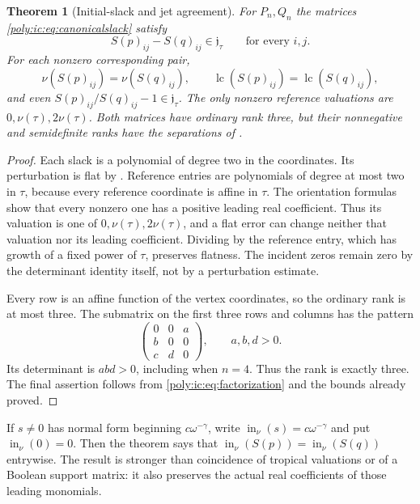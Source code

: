 \documentclass[11pt,a4paper]{article}
\numberwithin{equation}{section}
\newtheorem{theorem}{Theorem}[section]
\theoremstyle{plain}
\newcommand{\JJ}{\mathfrak j}
\newcommand{\lc}{\operatorname{lc}}
\newcommand{\ini}{\operatorname{in}_{\nu}}
\begin{document}
\begin{theorem}[Initial-slack and jet agreement]\label{poly:ic:thm:slack}
For $P_n,Q_n$ the matrices \eqref{poly:ic:eq:canonicalslack} satisfy
\[
 S(p)_{ij}-S(q)_{ij}\in\JJ_\tau\qquad\text{for every }i,j.
\]
For each nonzero corresponding pair,
\begin{equation}\label{poly:ic:eq:initialslack}
 \nu(S(p)_{ij})=\nu(S(q)_{ij}),\qquad
 \lc(S(p)_{ij})=\lc(S(q)_{ij}),
\end{equation}
and even $S(p)_{ij}/S(q)_{ij}-1\in\JJ_\tau$.
The only nonzero reference valuations are $0,\nu(\tau),2\nu(\tau)$.
Both matrices have ordinary rank three, but their nonnegative and
semidefinite ranks have the separations of .
\end{theorem}
\begin{proof}
Each slack is a polynomial of degree two in the coordinates. Its
perturbation is flat by . Reference entries are
polynomials of degree at most two in $\tau$, because every reference
coordinate is affine in $\tau$. The orientation formulas show that
every nonzero one has a positive leading real coefficient. Thus its
valuation is one of $0,\nu(\tau),2\nu(\tau)$, and a flat error can change
neither that valuation nor its leading coefficient. Dividing by the
reference entry, which has growth of a fixed power of $\tau$, preserves
flatness. The incident zeros remain zero by the determinant identity
itself, not by a perturbation estimate.

Every row is an affine function of the vertex coordinates, so the
ordinary rank is at most three. The submatrix on the first three rows
and columns has the pattern
\[
 \begin{pmatrix}0&0&a\\b&0&0\\c&d&0\end{pmatrix},
 \qquad a,b,d>0.
\]
Its determinant is $abd>0$, including when $n=4$. Thus the rank is exactly
three. The final assertion follows from \eqref{poly:ic:eq:factorization} and the
bounds already proved.
\end{proof}

If $s\ne0$ has normal form beginning $c\omega^{-\gamma}$, write
$\ini(s)=c\omega^{-\gamma}$ and put $\ini(0)=0$. Then the theorem says
that $\ini(S(p))=\ini(S(q))$ entrywise. The result is stronger than
coincidence of tropical valuations or of a Boolean support matrix: it
also preserves the actual real coefficients of those leading monomials.
\end{document}
